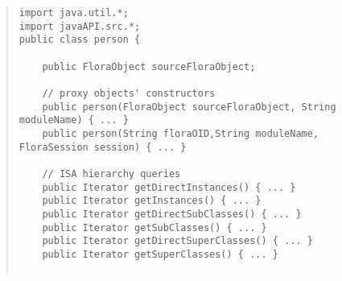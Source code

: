 \begin{quote}
\begin{verbatim}
import java.util.*;
import javaAPI.src.*;
public class person {

    public FloraObject sourceFloraObject;

    // proxy objects' constructors
    public person(FloraObject sourceFloraObject, String moduleName) { ... }
    public person(String floraOID,String moduleName, FloraSession session) { ... }

    // ISA hierarchy queries
    public Iterator getDirectInstances() { ... }
    public Iterator getInstances() { ... }
    public Iterator getDirectSubClasses() { ... }
    public Iterator getSubClasses() { ... }
    public Iterator getDirectSuperClasses() { ... }
    public Iterator getSuperClasses() { ... }


\end{verbatim}
\end{quote}
